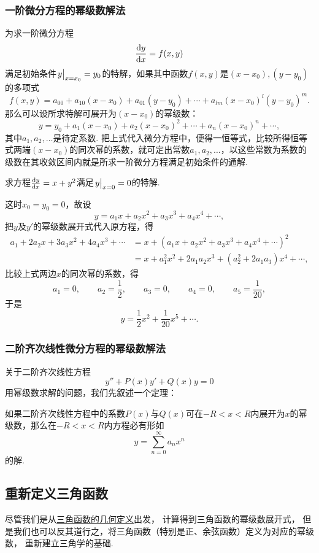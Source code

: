 \subsubsection{一阶微分方程的幂级数解法}
为求一阶微分方程\[
\dv{y}{x} = f(x,y)
\]满足初始条件\(\eval{y}_{x=x_0} = y_0\)的特解，如果其中函数\(f(x,y)\)是\((x-x_0),(y-y_0)\)的多项式\[
f(x,y) = a_{00} + a_{10} (x-x_0) + a_{01} (y-y_0) + \dotsb + a_{lm} (x-x_0)^l (y-y_0)^m.
\]那么可以设所求特解可展开为\((x-x_0)\)的幂级数：\[
y = y_0 + a_1 (x-x_0) + a_2 (x-x_0)^2 + \dotsb + a_n (x-x_0)^n + \dotsb,
\]其中\(a_1,a_2,\dotsc\)是待定系数.
把上式代入微分方程中，便得一恒等式，比较所得恒等式两端\((x-x_0)\)的同次幂的系数，就可定出常数\(a_1,a_2,\dotsc\)，以这些常数为系数的级数在其收敛区间内就是所求一阶微分方程满足初始条件的通解.

\begin{example}
求方程\(\dv{y}{x} = x + y^2\)满足\(\eval{y}_{x=0}=0\)的特解.
\begin{solution}
这时\(x_0=y_0=0\)，故设\[
y = a_1 x + a_2 x^2 + a_3 x^3 + a_4 x^4 + \dotsb,
\]把\(y\)及\(y'\)的幂级数展开式代入原方程，得\begin{align*}
a_1 + 2a_2 x + 3a_3 x^2 + 4a_4 x^3 + \dotsb
&= x + (a_1 x + a_2 x^2 + a_3 x^3 + a_4 x^4 + \dotsb)^2 \\
&= x + a_1^2 x^2 + 2a_1a_2 x^3 + (a_2^2 + 2a_1a_3) x^4 + \dotsb,
\end{align*}
比较上式两边\(x\)的同次幂的系数，得\[
a_1 = 0, \qquad
a_2 = \frac{1}{2}, \qquad
a_3 = 0, \qquad
a_4 = 0, \qquad
a_5 = \frac{1}{20},
\]于是\[
y = \frac{1}{2} x^2 + \frac{1}{20} x^5 + \dotsb.
\]
\end{solution}
\end{example}

\subsubsection{二阶齐次线性微分方程的幂级数解法}
关于二阶齐次线性方程\[
y'' + P(x) y' + Q(x) y = 0
\]用幂级数求解的问题，我们先叙述一个定理：
\begin{theorem}
如果二阶齐次线性方程中的系数\(P(x)\)与\(Q(x)\)可在\(-R<x<R\)内展开为\(x\)的幂级数，那么在\(-R<x<R\)内方程必有形如\[
y = \sum\limits_{n=0}^\infty a_n x^n
\]的解.
\end{theorem}

\subsection{重新定义三角函数}
尽管我们是从\hyperref[definition:函数.三角函数的几何定义]{三角函数的几何定义}出发，
计算得到三角函数的幂级数展开式，
但是我们也可以反其道行之，将三角函数（特别是正、余弦函数）定义为对应的幂级数，
重新建立三角学的基础.


